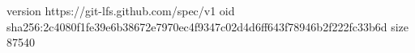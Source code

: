 version https://git-lfs.github.com/spec/v1
oid sha256:2c4080f1fe39e6b38672e7970ec4f9347c02d4d6ff643f78946b2f222fc33b6d
size 87540
